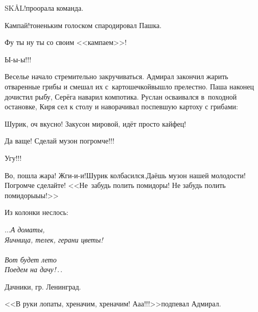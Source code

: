\diagdash SKÅL!\mdash проорала команда.

\diagdash Кампай!\mdash тоненьким голоском спародировал Пашка.

\diagdash Фу ты ну ты со своим <<кампаем>>!

\diagdash Ы-ы-ы!!!

Веселье начало стремительно закручиваться. Адмирал закончил жарить отваренные грибы и смешал их с~картошечкой\mdash вышло прелестно. Паша наконец дочистил рыбу, Серёга наварил компотика. Руслан осваивался в~походной остановке, Киря сел к столу и наворачивал поспевшую картоху с грибами:

\diagdash Шурик, оч вкусно! Закусон мировой, идёт просто кайфец!

\diagdash Да ваще! Сделай музон погромче!!!

\diagdash Угу!!!

\diagdash Во, пошла жара! Жги-и-и!\mdash Шурик колбасился.\mdash Даёшь музон нашей молодости! Погромче сделайте! <<Не~забудь полить помидоры! Не забудь полить помидоры\sdash ы\sdash ы!>>

Из колонки неслось:

\vspace{0.3cm}
\noindent\textit{%
	\hspace*{3.2cm}$\ldots$А дома\mdash ты,\\
	\hspace*{3.2cm}Яичница, телек, герани цветы!\\
	\\
	\hspace*{3.2cm}Вот будет лето\mdash\\
	\hspace*{3.2cm}Поедем на дачу$\exldotsit$%
}

{\raggedleft \scriptsize \mdash Дачники, гр. Ленинград. \par}

\vspace{0.1cm}

\diagdash <<В руки лопаты, хреначим, хреначим! А\sdash а\sdash а!!!>>\mdash подпевал Адмирал.


